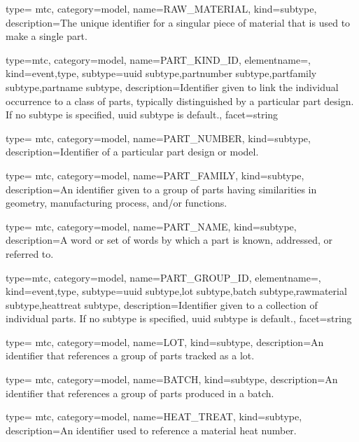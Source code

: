 {
  type= mtc,
  category=model,
  name={RAW\_MATERIAL},
  kind={subtype},
  description={The unique identifier for a singular piece of material that is used to make a single part.}
}


{
  type=mtc,
  category=model,
  name={PART\_KIND\_ID},
  elementname=,
  kind={event,type},
  subtype={\gls{uuid subtype},\gls{partnumber subtype},\gls{partfamily subtype},\gls{partname subtype}},
  description={Identifier given to link the individual occurrence to a class of parts, typically distinguished by a particular part design. If no \gls{subtype} is specified, \gls{uuid subtype} is default.},
  facet={\gls{string}}
}

{
  type= mtc,
  category=model,
  name={PART\_NUMBER},
  kind={subtype},
  description={Identifier of a particular part design or model.}
}

{
  type= mtc,
  category=model,
  name={PART\_FAMILY},
  kind={subtype},
  description={An identifier given to a group of parts having similarities in geometry, manufacturing process, and/or functions.}
}

{
  type= mtc,
  category=model,
  name={PART\_NAME},
  kind={subtype},
  description={A word or set of words by which a part is known, addressed, or referred to.}
}

{
  type=mtc,
  category=model,
  name={PART\_GROUP\_ID},
  elementname=,
  kind={event,type},
  subtype={\gls{uuid subtype},\gls{lot subtype},\gls{batch subtype},\gls{rawmaterial subtype},\gls{heattreat subtype}},
  description={Identifier given to a collection of individual parts. If no \gls{subtype} is specified, \gls{uuid subtype} is default.},
  facet={\gls{string}}
}

{
  type= mtc,
  category=model,
  name={LOT},
  kind={subtype},
  description={An identifier that references a group of parts tracked as a lot.}
}

{
  type= mtc,
  category=model,
  name={BATCH},
  kind={subtype},
  description={An identifier that references a group of parts produced in a batch.}
}

{
  type= mtc,
  category=model,
  name={HEAT\_TREAT},
  kind={subtype},
  description={An identifier used to reference a material heat number.}
}

